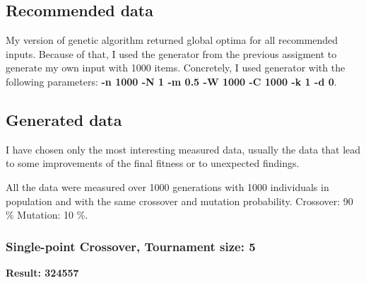 \documentclass{article}
\begin{document}
	\subsection{Recommended data}
	My version of genetic algorithm returned global optima for all recommended inputs. Because of that, I used the generator from the previous assigment to generate my own input with 1000 items. Concretely, I used generator with the following parameters: \textbf{-n 1000 -N 1 -m 0.5 -W 1000 -C 1000 -k 1 -d 0}.

	\subsection{Generated data}
	I have chosen only the most interesting measured data, usually the data that lead to some improvements of the final fitness or to unexpected findings.

	All the data were measured over 1000 generations with 1000 individuals in population and with the same crossover and mutation probability. Crossover: 90 \% Mutation: 10 \%.
	\subsubsection{Single-point Crossover, Tournament size: 5}
	\textbf{Result: 324557} 
	\begin{figure}[h!]
		\centering
	\end{figure}

	\clearpage
\end{document}
